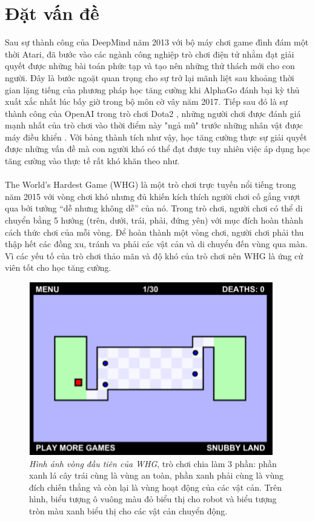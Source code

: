 \section{Đặt vấn đề}
Sau sự thành công của DeepMind năm 2013 với bộ máy chơi game đình đám một thời Atari\cite{DBLP:journals/corr/MnihKSGAWR13}, đã bước vào các ngành công nghiệp trò chơi điện tử nhằm đạt giải quyết được những bài toán phức tạp và tạo nên những thử thách mới cho con người. Đây là bước ngoặt quan trọng cho sự trở lại mãnh liệt sau khoảng thời gian lặng tiếng của phương pháp học tăng cường khi AlphaGo\cite{44806} đánh bại kỳ thủ xuất xắc nhất lúc bấy giờ trong bộ môn cờ vây năm 2017. Tiếp sau đó là sự thành công của OpenAI trong trò chơi Dota2\cite{openai2019dota} , những người chơi được đánh giá mạnh nhất của trò chơi vào thời điểm này "ngả mũ" trước những nhân vật được máy điều khiển . Với bảng thành tích như vậy, học tăng cường thực sự giải quyết được những vấn đề mà con người khó có thể đạt được tuy nhiên việc áp dụng học tăng cường vào thực tế rất khó khăn theo như\cite{DBLP:journals/corr/abs-1904-12901}.\\
\\
The World’s Hardest Game\cite{WHGwebsite} (WHG) là một trò chơi trực tuyến nổi tiếng trong năm 2015 với vòng chơi khó nhưng đủ khiến kích thích người chơi cố gắng vượt qua bởi tưởng “dễ nhưng không dễ” của nó. Trong trò chơi, người chơi có thể di chuyển bằng 5 hướng (trên, dưới, trái, phải, đứng yên) với mục đích hoàn thành cách thức chơi của mỗi vòng. Để hoàn thành một vòng chơi, người chơi phải thu thập hết các đồng xu, tránh va phải các vật cản và di chuyển đến vùng qua màn. Vì các yếu tố của trò chơi thảo mãn \cite{MarkovProperty} và độ khó của trò chơi nên WHG là ứng cử viên tốt cho học tăng cường.\\
\begin{figure}[h]
    \centering
    \includegraphics[height=0.3\textheight]{Pic/lv1game.png}
    \caption[Vòng đầu tiên của WHG]{\textit{Hình ảnh vòng đầu tiên của WHG}, trò chơi chia làm 3 phần: phần xanh lá cây trái cùng là vùng an toàn, phần xanh phải cùng là vùng đích chiến thắng và còn lại là vùng hoạt động của các vật cản. Trên hình, biểu tượng ô vuông màu đỏ biểu thị cho robot và biểu tượng tròn màu xanh biểu thị cho các vật cản chuyển động.}
    \label{fig:lv1game}
\end{figure}
